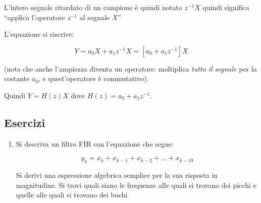 	L'intero segnale ritardato di un campione \`e quindi notato $z^{-1} X$ quindi
		significa ``applica l'operatore $z^{-1}$ al segnale $X$''

		L'equazione si riscrive:

		 \begin{equation}
		  Y = a_0 X + a_1 z^{-1} X = \left [ a_0 + a_1 z^{-1} \right ] X
		 \end{equation}

		(nota che anche l'ampiezza diventa un operatore: moltiplica \emph{tutto il
		segnale} per la costante $a_0$, e quest'operatore \`e commutativo).

	Quindi $Y = H(z) X$ dove $H(z) = a_0 + a_1 z^{-1}$.


\subsection{Esercizi}

\begin{enumerate}

	\item Si descriva un filtro FIR con l'equazione che segue:

					\begin{equation}
						y_k = x_k + x_{k-1} + x_{k-2} + \ldots + x_{k-19}
					\end{equation}

				Si derivi una espressione algebrica semplice per la sua risposta in
				magnitudine. Si trovi quali siano le frequenze alle quali si trovano
				dei picchi e quelle alle quali si trovano dei buchi

\end{enumerate}
